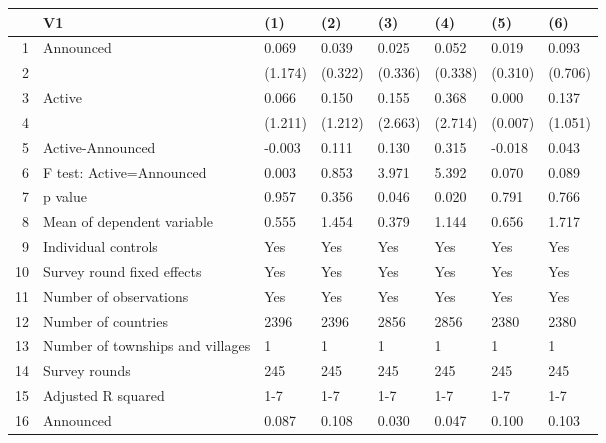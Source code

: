 \begin{table}[ht]
\centering
\begin{tabular}{rlllllll}
  \hline
 & V1 & (1) & (2) & (3) & (4) & (5) & (6) \\ 
  \hline
1 & Announced & 0.069 & 0.039 & 0.025 & 0.052 & 0.019 & 0.093 \\ 
  2 &  & (1.174) & (0.322) & (0.336) & (0.338) & (0.310) & (0.706) \\ 
  3 & Active & 0.066 & 0.150 & 0.155 & 0.368 & 0.000 & 0.137 \\ 
  4 &  & (1.211) & (1.212) & (2.663) & (2.714) & (0.007) & (1.051) \\ 
  5 & Active-Announced & -0.003 & 0.111 & 0.130 & 0.315 & -0.018 & 0.043 \\ 
  6 & F test: Active=Announced & 0.003 & 0.853 & 3.971 & 5.392 & 0.070 & 0.089 \\ 
  7 & p value & 0.957 & 0.356 & 0.046 & 0.020 & 0.791 & 0.766 \\ 
  8 & Mean of dependent variable & 0.555 & 1.454 & 0.379 & 1.144 & 0.656 & 1.717 \\ 
  9 & Individual controls & Yes & Yes & Yes & Yes & Yes & Yes \\ 
  10 & Survey round fixed effects & Yes & Yes & Yes & Yes & Yes & Yes \\ 
  11 & Number of observations & Yes & Yes & Yes & Yes & Yes & Yes \\ 
  12 & Number of countries & 2396 & 2396 & 2856 & 2856 & 2380 & 2380 \\ 
  13 & Number of townships and villages & 1 & 1 & 1 & 1 & 1 & 1 \\ 
  14 & Survey rounds & 245 & 245 & 245 & 245 & 245 & 245 \\ 
  15 & Adjusted R squared & 1-7 & 1-7 & 1-7 & 1-7 & 1-7 & 1-7 \\ 
  16 & Announced & 0.087 & 0.108 & 0.030 & 0.047 & 0.100 & 0.103 \\ 
   \hline
\end{tabular}
\end{table}

